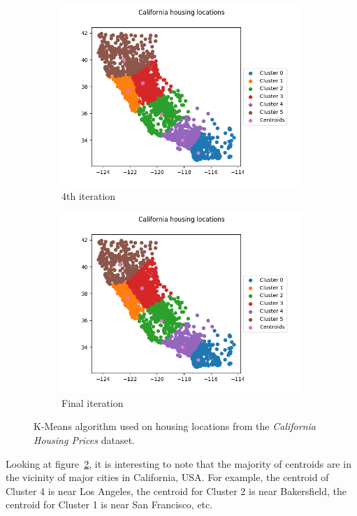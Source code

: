 \documentclass[a4paper]{article}
\begin{document}
\begin{figure}[!htp]
	\begin{subfigure}{0.5\columnwidth}
		\centering
		\includegraphics[width=\textwidth]{images/4.png}
		\caption{4th iteration}
		\label{figure:iteration-4}
	\end{subfigure}\hfill
	\begin{subfigure}{0.5\columnwidth}
		\centering
		\includegraphics[width=\textwidth]{images/5.png}
		\caption{Final iteration}
		\label{figure:iteration-5}
	\end{subfigure}
	
	\caption{K-Means algorithm used on housing locations from the \textit{California Housing Prices} dataset\cite{PJZZoRfZVMc9ZRlw}.}
	\label{figure:k-means-california-dataset}
\end{figure}
Looking at figure~\ref{figure:iteration-5}, it is interesting to note that the majority of centroids are in the vicinity of major cities in California, USA. For example, the centroid of Cluster 4 is near Los Angeles, the centroid for Cluster 2 is near Bakersfield, the centroid for Cluster 1 is near San Francisco, etc.
\end{document}
